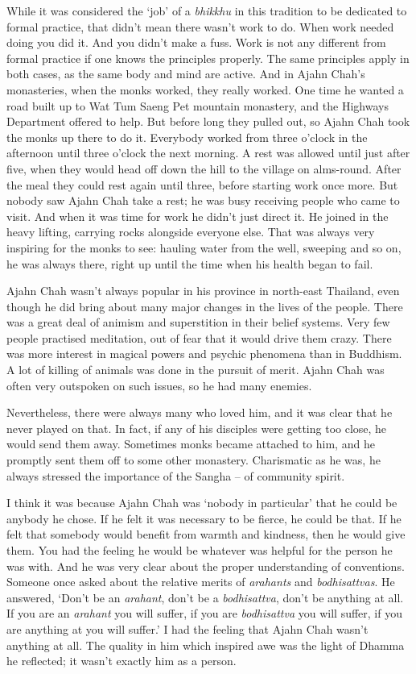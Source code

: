 While it was considered the `job' of a \emph{bhikkhu} in this tradition
to be dedicated to formal practice, that didn't mean there wasn't work
to do. When work needed doing you did it. And you didn't make a fuss. 
Work is not any different from formal practice if one knows the
principles properly. The same principles apply in both cases, as the
same body and mind are active. And in Ajahn Chah's monasteries, when the
monks worked, they really worked. One time he wanted a road built up to
Wat Tum Saeng Pet mountain monastery, and the Highways Department
offered to help. But before long they pulled out, so Ajahn Chah took the
monks up there to do it. Everybody worked from three o'clock in the
afternoon until three o'clock the next morning. A rest was allowed until
just after five, when they would head off down the hill to the village
on alms-round. After the meal they could rest again until three, before
starting work once more. But nobody saw Ajahn Chah take a rest; he was
busy receiving people who came to visit. And when it was time for work
he didn't just direct it. He joined in the heavy lifting, carrying rocks
alongside everyone else. That was always very inspiring for the monks to
see: hauling water from the well, sweeping and so on, he was always
there, right up until the time when his health began to fail. 

Ajahn Chah wasn't always popular in his province in north-east Thailand, 
even though he did bring about many major changes in the lives of the
people. There was a great deal of animism and superstition in their
belief systems. Very few people practised meditation, out of fear that
it would drive them crazy. There was more interest in magical powers and
psychic phenomena than in Buddhism. A lot of killing of animals was done
in the pursuit of merit. Ajahn Chah was often very outspoken on such
issues, so he had many enemies. 

Nevertheless, there were always many who loved him, and it was clear
that he never played on that. In fact, if any of his disciples were
getting too close, he would send them away. Sometimes monks became
attached to him, and he promptly sent them off to some other monastery. 
Charismatic as he was, he always stressed the importance of the Sangha
-- of community spirit. 

I think it was because Ajahn Chah was `nobody in particular' that he
could be anybody he chose. If he felt it was necessary to be fierce, he
could be that. If he felt that somebody would benefit from warmth and
kindness, then he would give them. You had the feeling he would be
whatever was helpful for the person he was with. And he was very clear
about the proper understanding of conventions. Someone once asked about
the relative merits of \emph{arahants} and \emph{bodhisattvas}. He
answered, `Don't be an \emph{arahant}, don't be a \emph{bodhisattva}, 
don't be anything at all. If you are an \emph{arahant} you will suffer, 
if you are \emph{bodhisattva} you will suffer, if you are anything at
you will suffer.' I had the feeling that Ajahn Chah wasn't anything at
all. The quality in him which inspired awe was the light of Dhamma he
reflected; it wasn't exactly him as a person. 


